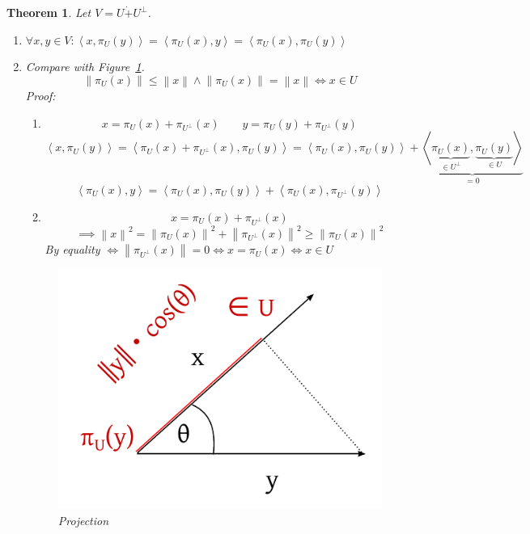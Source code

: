 \documentclass[a4paper]{article}
\newcounter{lecref}[section]
\numberwithin{lecref}{section}
\newtheorem{theorem}[lecref]{Theorem}
\newcommand{\ip}[2]{\left\langle#1,#2\right\rangle} %
\newcommand{\norm}[1]{\left\|#1\right\|}
\begin{document}
\begin{theorem} %
  Let $V = U \dot+ U^{\bot}$.
  \begin{enumerate}
    \item $\forall x, y \in V: \ip{x}{\pi_{U}(y)} = \ip{\pi_U(x)}{y} = \ip{\pi_U(x)}{\pi_U(y)}$
    \item Compare with Figure~\ref{img:proj}.
        \[ \norm{\pi_U(x)} \leq \norm{x} \land \norm{\pi_U(x)} = \norm{x} \iff x \in U \]
        Proof:
        \begin{enumerate}
          \item
            \[ x = \pi_U(x) + \pi_{U^\bot}(x) \qquad y = \pi_U(y) + \pi_{U^\bot}(y) \]
            \[ \ip{x}{\pi_U(y)} = \ip{\pi_U(x) + \pi_{U^\bot}(x)}{\pi_U(y)} = \ip{\pi_U(x)}{\pi_U(y)} + \underbrace{\ip{\underbrace{\pi_U(x)}_{\in U^\bot}}{\underbrace{\pi_U(y)}_{\in U}}}_{= 0} \]
            \[ \ip{\pi_U(x)}{y} = \ip{\pi_U(x)}{\pi_U(y)} + \ip{\pi_U(x)}{\pi_{U^\bot}(y)} \]
          \item
            \[ x = \pi_U(x) + \pi_{U^\bot}(x) \]
            \[ \implies \norm{x}^2 = \norm{\pi_U(x)}^2 + \norm{\pi_{U^\bot}(x)}^2 \geq \norm{\pi_U(x)}^2 \]
            By equality $\iff \norm{\pi_{U^\bot}(x)} = 0 \iff x = \pi_U(x) \iff x \in U$
        \end{enumerate}
        \begin{figure}[!ht]
          \begin{center}
            \includegraphics{img/10_projection.pdf}
            \caption{Projection}
            \label{img:proj}
          \end{center}
        \end{figure}
  \end{enumerate}
\end{theorem}
\end{document}
